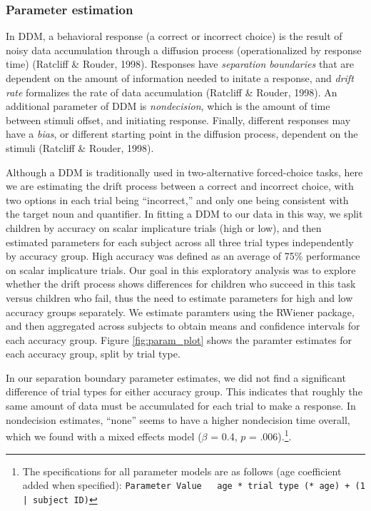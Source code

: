 \documentclass[10pt, letterpaper]{article}
\begin{document}
\subsubsection{Parameter estimation}\label{parameter-estimation}

In DDM, a behavioral response (a correct or incorrect choice) is the
result of noisy data accumulation through a diffusion process
(operationalized by response time) (Ratcliff \& Rouder, 1998). Responses
have \emph{separation boundaries} that are dependent on the amount of
information needed to initate a response, and \emph{drift rate}
formalizes the rate of data accumulation (Ratcliff \& Rouder, 1998). An
additional parameter of DDM is \emph{nondecision}, which is the amount
of time between stimuli offset, and initiating response. Finally,
different responses may have a \emph{bias}, or different starting point
in the diffusion process, dependent on the stimuli (Ratcliff \& Rouder,
1998).

Although a DDM is traditionally used in two-alternative forced-choice
tasks, here we are estimating the drift process between a correct and
incorrect choice, with two options in each trial being ``incorrect,''
and only one being consistent with the target noun and quantifier. In
fitting a DDM to our data in this way, we split children by accuracy on
scalar implicature trials (high or low), and then estimated parameters
for each subject across all three trial types independently by accuracy
group. High accuracy was defined as an average of 75\% performance on
scalar implicature trials. Our goal in this exploratory analysis was to
explore whether the drift process shows differences for children who
succeed in this task versus children who fail, thus the need to estimate
parameters for high and low accuracy groups separately. We estimate
paramters using the RWiener package, and then aggregated across subjects
to obtain means and confidence intervals for each accuracy group. Figure
\ref{fig:param_plot} shows the paramter estimates for each accuracy
group, split by trial type.

In our separation boundary parameter estimates, we did not find a
significant difference of trial types for either accuracy group. This
indicates that roughly the same amount of data must be accumulated for
each trial to make a response. In nondecision estimates, ``none'' seems
to have a higher nondecision time overall, which we found with a mixed
effects model (\(\beta\) = 0.4, \(p\) =
.006).\footnote{The specifications for all parameter models are as follows (age coefficient added when specified): \texttt{Parameter Value ~ age * trial type (* age) + (1 | subject ID)}}.
\end{document}
